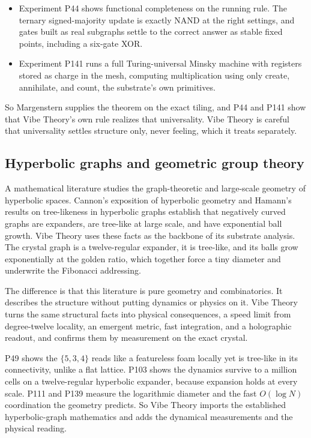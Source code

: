 \begin{itemize}
\item Experiment P44 shows functional completeness on the running
rule. The ternary signed-majority update is exactly NAND at the right settings, and gates built as real
subgraphs settle to the correct answer as stable fixed points, including a six-gate XOR.
\item Experiment P141 runs
a full Turing-universal Minsky machine with registers stored as charge in the mesh, computing multiplication
using only create, annihilate, and count, the substrate's own primitives.
\end{itemize}

So Margenstern supplies the theorem
on the exact tiling, and P44 and P141 show that Vibe Theory's own rule realizes that universality. Vibe Theory
is careful that universality settles structure only, never feeling, which it treats separately.

\subsection{Hyperbolic graphs and geometric group theory}

A mathematical literature studies the graph-theoretic and large-scale geometry of hyperbolic spaces. Cannon's
exposition of hyperbolic geometry \cite{cannon1997} and Hamann's results on tree-likeness in hyperbolic
graphs \cite{hamann2011} establish that negatively curved graphs are expanders, are tree-like at large scale,
and have exponential ball growth. Vibe Theory uses these facts as the backbone of its substrate analysis. The
crystal graph is a twelve-regular expander, it is tree-like, and its balls grow exponentially at the golden
ratio, which together force a tiny diameter and underwrite the Fibonacci addressing.

The difference is that this literature is pure geometry and combinatorics. It describes the structure without
putting dynamics or physics on it. Vibe Theory turns the same structural facts into physical consequences, a
speed limit from degree-twelve locality, an emergent metric, fast integration, and a holographic readout, and
confirms them by measurement on the exact crystal.

P49 shows the $\{5,3,4\}$ reads like a featureless foam
locally yet is tree-like in its connectivity, unlike a flat lattice. P103 shows the dynamics survive to a
million cells on a twelve-regular hyperbolic expander, because expansion holds at every scale. P111 and P139
measure the logarithmic diameter and the fast $O(\log N)$ coordination the geometry predicts. So Vibe Theory
imports the established hyperbolic-graph mathematics and adds the dynamical measurements and the physical
reading.

